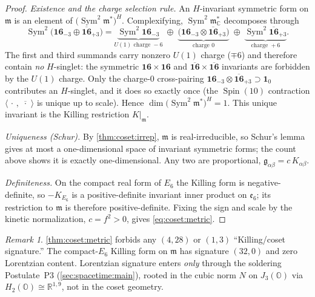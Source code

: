 \documentclass[11pt]{article}
\theoremstyle{plain}
\theoremstyle{definition}
\theoremstyle{remark}
\newtheorem{remark}[theorem]{Remark}
\newcommand{\Spin}{\operatorname{Spin}}
\newcommand{\Sym}{\operatorname{Sym}}
\begin{document}
\begin{proof}
\emph{Existence and the charge selection rule.} An $H$-invariant symmetric form
on $\mathfrak m$ is an element of $\bigl(\Sym^{2}\mathfrak m^{*}\bigr)^{H}$.
Complexifying, $\Sym^{2}\mathfrak m_{\mathbb C}^{*}$ decomposes through
\begin{equation}\label{eq:coset:sym2}
  \Sym^{2}\!\bigl(\mathbf{16}_{-3}\oplus\overline{\mathbf{16}}_{+3}\bigr)
  = \underbrace{\Sym^{2}\mathbf{16}_{-3}}_{U(1)\text{ charge }-6}
    \;\oplus\;
    \underbrace{\bigl(\mathbf{16}_{-3}\otimes\overline{\mathbf{16}}_{+3}\bigr)}_{\text{charge }0}
    \;\oplus\;
    \underbrace{\Sym^{2}\overline{\mathbf{16}}_{+3}}_{\text{charge }+6}.
\end{equation}
The first and third summands carry nonzero $U(1)$ charge ($\mp 6$) and therefore
contain \emph{no} $H$-singlet: the symmetric $\mathbf{16}\times\mathbf{16}$ and
$\overline{\mathbf{16}}\times\overline{\mathbf{16}}$ invariants are forbidden by
the $U(1)$ charge. Only the charge-$0$ cross-pairing $\mathbf{16}_{-3}\otimes
\overline{\mathbf{16}}_{+3}\supset\mathbf 1_{0}$ contributes an $H$-singlet, and
it does so exactly once (the $\Spin(10)$ contraction
$\langle\,\cdot\,,\,\overline{\,\cdot\,}\,\rangle$ is unique up to scale). Hence
$\dim\bigl(\Sym^{2}\mathfrak m^{*}\bigr)^{H} = 1$. This unique invariant is the
Killing restriction $K|_{\mathfrak m}$.

\emph{Uniqueness (Schur).} By \autoref{thm:coset:irrep}, $\mathfrak m$ is
real-irreducible, so Schur's lemma gives at most a one-dimensional space of
invariant symmetric forms; the count above shows it is exactly one-dimensional.
Any two are proportional, $\mathfrak g_{\alpha\beta} = c\,K_{\alpha\beta}$.

\emph{Definiteness.} On the compact real form of $E_{6}$ the Killing form is
negative-definite, so $-K_{E_{6}}$ is a positive-definite invariant inner
product on $\mathfrak e_{6}$; its restriction to $\mathfrak m$ is therefore
positive-definite. Fixing the sign and scale by the kinetic normalization,
$c = f^{2}>0$, gives \eqref{eq:coset:metric}.
\end{proof}

\begin{remark}\label{rem:coset:nolorentz}
\autoref{thm:coset:metric} forbids any $(4,28)$ or $(1,3)$ ``Killing/coset
signature.'' The compact-$E_{6}$ Killing form on $\mathfrak m$ has signature
$(32,0)$ and zero Lorentzian content. Lorentzian signature enters \emph{only}
through the soldering Postulate~P3 (\autoref{sec:spacetime:main}), rooted in the cubic
norm $N$ on $J_{3}(\mathbb O)$ via $H_{2}(\mathbb O)\cong\mathbb R^{1,9}$, not in
the coset geometry.
\end{remark}
\end{document}
